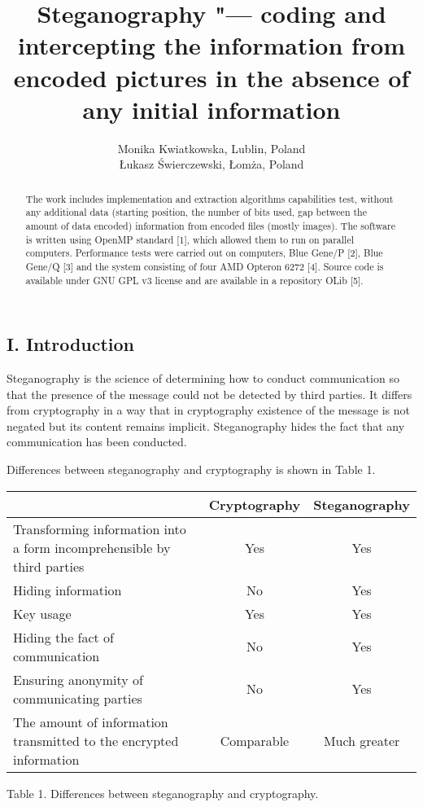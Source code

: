 \documentclass[10pt, a5paper]{article}
\begin{document}
\title{Steganography "--- coding and intercepting the information from encoded pictures in the absence of any initial information}
\author{Monika Kwiatkowska, Lublin, Poland\\ \L{}ukasz \'S{}wierczewski, \L{}om\.z{}a, Poland}
\maketitle
\begin{abstract}
The work includes implementation and extraction algorithms capabilities test, without any additional data (starting position, the number of bits used, gap between the amount of data encoded) information from encoded files (mostly images). The software is written using OpenMP standard [1], which allowed them to run on parallel computers. Performance tests were carried out on computers, Blue Gene/P [2], Blue Gene/Q [3] and the system consisting of four AMD Opteron 6272 [4]. Source code is available under GNU GPL v3 license and are available in a repository OLib [5].
\end{abstract}
\subsection*{I. Introduction}

Steganography is the science of determining how to conduct communication so that the presence of the message could not be detected by third parties. It differs from cryptography in a way that in cryptography existence of the message is not negated but its content remains implicit. Steganography hides the fact that any communication has been conducted.

Differences between steganography and cryptography is shown in Table 1.

\begin{center}
\begin{tabular}{P{13em}|c|c}
\hline
                                                                            & \textbf{Cryptography} & \textbf{Steganography} \\
\hline
Transforming information into a form in\-compre\-hensible by third parties  &     Yes      &     Yes       \\
Hiding information                                                          &     No       &     Yes       \\
Key usage                                                                   &     Yes      &     Yes       \\
Hiding the fact of commu\-ni\-ca\-tion                                      &     No       &     Yes       \\
Ensuring anonymity of commu\-ni\-ca\-ting parties                           &     No       &     Yes       \\
The amount of information transmitted to the encrypted information          &  Comparable  &  Much greater \\
\hline
\end{tabular}

Table 1. Differences between steganography and cryptography.
\end{center}
\end{document}
